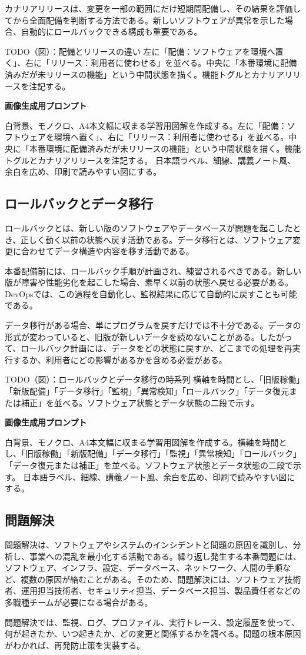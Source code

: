 \documentclass[uplatex,dvipdfmx,a4paper,10pt]{jsarticle}
\newcommand{\todoprompt}[2]{%
\begin{notebox}{TODO（図）：#1}
#2

\textbf{画像生成用プロンプト}

白背景、モノクロ、A4本文幅に収まる学習用図解を作成する。#2 日本語ラベル、細線、講義ノート風、余白を広め、印刷で読みやすい図にする。
\end{notebox}
}
\begin{document}
カナリアリリースは、変更を一部の範囲にだけ短期間配備し、その結果を評価してから全面配備を判断する方法である。新しいソフトウェアが異常を示した場合、自動的にロールバックできる構成も重要である。

\todoprompt{配備とリリースの違い}{左に「配備：ソフトウェアを環境へ置く」、右に「リリース：利用者に使わせる」を並べる。中央に「本番環境に配備済みだが未リリースの機能」という中間状態を描く。機能トグルとカナリアリリースを注記する。}

\subsection{ロールバックとデータ移行}

ロールバックとは、新しい版のソフトウェアやデータベースが問題を起こしたとき、正しく動く以前の状態へ戻す活動である。データ移行とは、ソフトウェア変更に合わせてデータ構造や内容を移す活動である。

本番配備前には、ロールバック手順が計画され、練習されるべきである。新しい版が障害や性能劣化を起こした場合、素早く以前の状態へ戻せる必要がある。DevOpsでは、この過程を自動化し、監視結果に応じて自動的に戻すことも可能である。

データ移行がある場合、単にプログラムを戻すだけでは不十分である。データの形式が変わっていると、旧版が新しいデータを読めないことがある。したがって、ロールバック計画には、データをどの状態に戻すか、どこまでの処理を再実行するか、利用者にどの影響があるかを含める必要がある。

\todoprompt{ロールバックとデータ移行の時系列}{横軸を時間とし、「旧版稼働」「新版配備」「データ移行」「監視」「異常検知」「ロールバック」「データ復元または補正」を並べる。ソフトウェア状態とデータ状態の二段で示す。}

\subsection{問題解決}

問題解決は、ソフトウェアやシステムのインシデントと問題の原因を識別し、分析し、事業への混乱を最小化する活動である。繰り返し発生する本番問題には、ソフトウェア、インフラ、設定、データベース、ネットワーク、人間の手順など、複数の原因が絡むことがある。そのため、問題解決には、ソフトウェア技術者、運用担当技術者、セキュリティ担当、データベース担当、製品責任者などの多職種チームが必要になる場合がある。

問題解決では、監視、ログ、プロファイル、実行トレース、設定履歴を使って、何が起きたか、いつ起きたか、どの変更と関係するかを調べる。問題の根本原因がわかれば、再発防止策を実装する。
\end{document}
